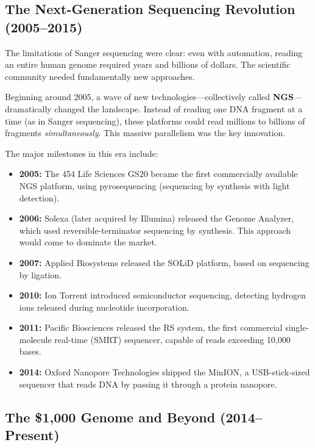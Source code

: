 \subsection{The Next-Generation Sequencing Revolution (2005--2015)}
\label{subsec:intro:ngs-revolution}

The limitations of Sanger sequencing were clear: even with automation, reading an entire human genome required years and billions of dollars. The scientific community needed fundamentally new approaches.

Beginning around 2005, a wave of new technologies---collectively called \textbf{\acrfull{NGS}}---dramatically changed the landscape. Instead of reading one DNA fragment at a time (as in Sanger sequencing), these platforms could read millions to billions of fragments \textit{simultaneously}. This massive parallelism was the key innovation.

The major milestones in this era include:

\begin{itemize}[itemsep=2pt]
  \item \textbf{2005:} The 454 Life Sciences GS20 became the first commercially available NGS platform, using pyrosequencing (sequencing by synthesis with light detection).
  \item \textbf{2006:} Solexa (later acquired by Illumina) released the Genome Analyzer, which used reversible-terminator sequencing by synthesis. This approach would come to dominate the market.
  \item \textbf{2007:} Applied Biosystems released the SOLiD platform, based on sequencing by ligation.
  \item \textbf{2010:} Ion Torrent introduced semiconductor sequencing, detecting hydrogen ions released during nucleotide incorporation.
  \item \textbf{2011:} Pacific Biosciences released the RS system, the first commercial single-molecule real-time (SMRT) sequencer, capable of reads exceeding 10,000 bases.
  \item \textbf{2014:} Oxford Nanopore Technologies shipped the MinION, a USB-stick-sized sequencer that reads DNA by passing it through a protein nanopore.
\end{itemize}

\subsection{The \$1,000 Genome and Beyond (2014--Present)}
\label{subsec:intro:1000-genome}

